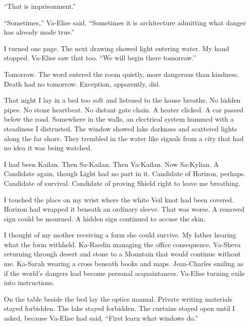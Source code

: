 ``That is imprisonment.''\par

``Sometimes,'' Va-Elise said. ``Sometimes it is architecture admitting what danger has already made true.''\par

I turned one page. The next drawing showed light entering water. My hand stopped. Va-Elise saw that too. ``We will begin there tomorrow.''\par

Tomorrow. The word entered the room quietly, more dangerous than kindness. Death had no tomorrow. Exception, apparently, did.\par

\ornament

That night I lay in a bed too soft and listened to the house breathe. No hidden pipes. No stone heartbeat. No distant gate chain. A heater clicked. A car passed below the road. Somewhere in the walls, an electrical system hummed with a steadiness I distrusted. The window showed lake darkness and scattered lights along the far shore. They trembled in the water like signals from a city that had no idea it was being watched.\par

I had been Kailan. Then Sa-Kailan. Then Va-Kailan. Now Sa-Kylian. A Candidate again, though Light had no part in it. Candidate of Horizon, perhaps. Candidate of survival. Candidate of proving Shield right to leave me breathing.\par

I touched the place on my wrist where the white Veil knot had been covered. Horizon had wrapped it beneath an ordinary sleeve. That was worse. A removed sign could be mourned. A hidden sign continued to accuse the skin.\par

I thought of my mother receiving a form she could survive. My father hearing what the form withheld. Ka-Raedin managing the office consequence. Va-Sheva returning through desert and stone to a Mountain that would continue without me. Ka-Sarah wearing a cross beneath books and maps. Jean-Charles smiling as if the world's dangers had become personal acquaintances. Va-Elise turning exile into instructions.\par

On the table beside the bed lay the optics manual. Private writing materials stayed forbidden. The lake stayed forbidden. The curtains stayed open until I asked, because Va-Elise had said, ``First learn what windows do.''\par

